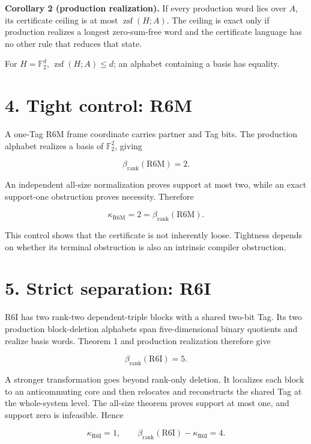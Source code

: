 \documentclass[
  11pt,
]{article}
\begin{document}
\textbf{Corollary 2 (production realization).} If every production word
lies over \(A\), its certificate ceiling is at most
\(\operatorname{zsf}(H; A)\). The ceiling is exact only if production
realizes a longest zero-sum-free word and the certificate language has
no other rule that reduces that state.

For \(H=\mathbb F_2^d\), \(\operatorname{zsf}(H; A)\le d\); an alphabet
containing a basis has equality.

\hypertarget{tight-control-r6m}{%
\section{4. Tight control: R6M}\label{tight-control-r6m}}

A one-Tag R6M frame coordinate carries partner and Tag bits. The
production alphabet realizes a basis of \(\mathbb F_2^2\), giving

\[
\beta_{\mathrm{rank}}(\mathrm{R6M})=2.
\]

An independent all-size normalization proves support at most two, while
an exact support-one obstruction proves necessity. Therefore

\[
\kappa_{\mathrm{R6M}}=2
=\beta_{\mathrm{rank}}(\mathrm{R6M}).
\]

This control shows that the certificate is not inherently loose.
Tightness depends on whether its terminal obstruction is also an
intrinsic compiler obstruction.

\hypertarget{strict-separation-r6i}{%
\section{5. Strict separation: R6I}\label{strict-separation-r6i}}

R6I has two rank-two dependent-triple blocks with a shared two-bit Tag.
Its two production block-deletion alphabets span five-dimensional binary
quotients and realize basis words. Theorem 1 and production realization
therefore give

\[
\beta_{\mathrm{rank}}(\mathrm{R6I})=5.
\]

A stronger transformation goes beyond rank-only deletion. It localizes
each block to an anticommuting core and then relocates and reconstructs
the shared Tag at the whole-system level. The all-size theorem proves
support at most one, and support zero is infeasible. Hence

\[
\kappa_{\mathrm{R6I}}=1,
\qquad
\beta_{\mathrm{rank}}(\mathrm{R6I})-\kappa_{\mathrm{R6I}}=4.
\]
\end{document}
